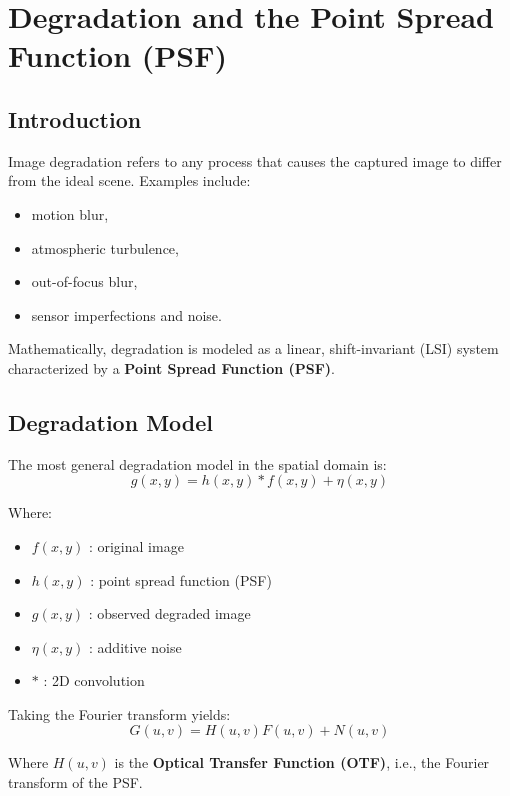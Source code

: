 \documentclass{AnantDocumentation}
\begin{document}
\section{Degradation and the Point Spread Function (PSF)}

\subsection{Introduction}

Image degradation refers to any process that causes the captured image to differ from the ideal scene.  
Examples include:
\begin{itemize}
\item motion blur,
\item atmospheric turbulence,
\item out-of-focus blur,
\item sensor imperfections and noise.
\end{itemize}

Mathematically, degradation is modeled as a linear, shift-invariant (LSI) system characterized by a \textbf{Point Spread Function (PSF)}.

\subsection{Degradation Model}

The most general degradation model in the spatial domain is:
\begin{equation}
g(x,y) = h(x,y) * f(x,y) + \eta(x,y)
\end{equation}

Where:
\begin{itemize}
\item $f(x,y)$ : original image  
\item $h(x,y)$ : point spread function (PSF)  
\item $g(x,y)$ : observed degraded image  
\item $\eta(x,y)$ : additive noise  
\item $*$ : 2D convolution  
\end{itemize}

Taking the Fourier transform yields:
\begin{equation}
G(u,v) = H(u,v)F(u,v) + N(u,v)
\end{equation}

Where $H(u,v)$ is the \textbf{Optical Transfer Function (OTF)}, i.e., the Fourier transform of the PSF.
\end{document}
